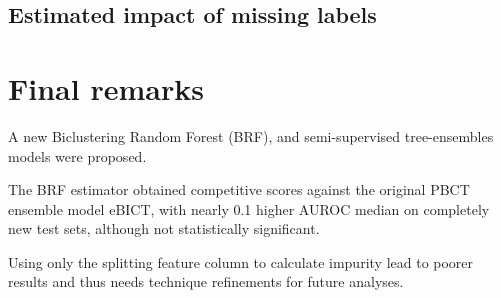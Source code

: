 \documentclass[conference]{IEEEtran}
\begin{document}
\subsection{Estimated impact of missing labels}


\section{Final remarks}

A new Biclustering Random Forest (BRF), and semi-supervised tree-ensembles models were proposed.

The BRF estimator obtained competitive scores against the original PBCT ensemble model eBICT, with nearly 0.1 higher AUROC median on completely new test sets, although not statistically significant.

Using only the splitting feature column to calculate impurity lead to poorer results and thus needs technique refinements for future analyses.

% 
% 
% 
% 


\end{document}
